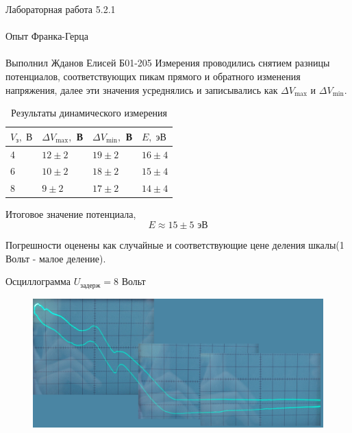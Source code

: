 \documentclass{astroedu-lab}
\begin{document}
\begin{problem}{\huge Лабораторная работа 5.2.1\\\\Опыт Франка-Герца\\\\Выполнил Жданов Елисей Б01-205}
Измерения проводились снятием разницы потенциалов, соответствующих пикам прямого и обратного изменения напряжения, далее эти значения усреднялись и записывались как  $\Delta V_{\max}$ и $\Delta V_{\min}$.
\\
 \begin{table}[h]
 	\centering
 	\begin{tabular}{|l|l|l|l|}
 		\hline
 		$V_{\text{з}}, \;В$ & $\Delta V_{\max}, $ В & $\Delta V_{\min}, $ В & $E,\; \text{эВ}$ \\ \hline
4  & $12\pm 2$   & $19\pm 2$  & $16 \pm 4$     \\ \hline
6  & $10\pm 2$   & $18\pm 2$  & $15 \pm 4$     \\ \hline
8  & $9\pm 2$    & $17\pm 2$  & $14 \pm 4$     \\ \hline
 	\end{tabular}
 \label{tab:1}
 \caption{Результаты динамического измерения}
 \end{table}


Итоговое значение потенциала,
\begin{equation}\label{key}
	E \approx 15 \pm 5 \text{ эВ}
\end{equation}

Погрешности оценены как случайные и соответствующие цене деления шкалы(1 Вольт - малое деление).

\begin{center}
	\Large Осциллограмма $U_\text{задерж} = 8 \text{ Вольт}$
\end{center}

\begin{figure}[!h]
	\centering
	\includegraphics[width=1\textwidth]{8v.jpg}
	\label{fig:boiler}
\end{figure}

%


\end{problem}
\end{document}
